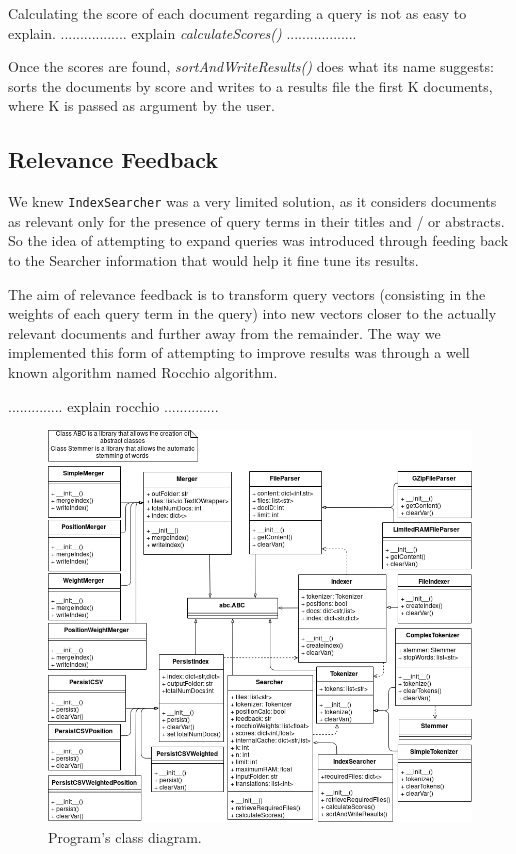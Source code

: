 \documentclass[12pt]{article}
\begin{document}
Calculating the score of each document regarding a query is not as easy to explain.
................. explain \textit{calculateScores()} ..................

Once the scores are found, \textit{sortAndWriteResults()} does what its name 
suggests: sorts the documents by score and writes to a results file the first K
documents, where K is passed as argument by the user.

\subsection{Relevance Feedback}

We knew \texttt{IndexSearcher} was a very limited solution, as it considers 
documents as relevant only for the presence of query terms in their titles 
and / or abstracts.
So the idea of attempting to expand queries was introduced through feeding back
to the Searcher information that would help it fine tune its results.

The aim of relevance feedback is to transform query vectors (consisting in the
weights of each query term in the query) into new vectors closer to the actually
relevant documents and further away from the remainder.
The way we implemented this form of attempting to improve results was through 
a well known algorithm named Rocchio algorithm.

.............. explain rocchio ..............

\begin{figure}[h!]
\includegraphics[width=\linewidth]{ClassDiagram_assign3.png}
\caption{Program's class diagram.}
\label{fig:classdiagram}
\end{figure}
\end{document}
